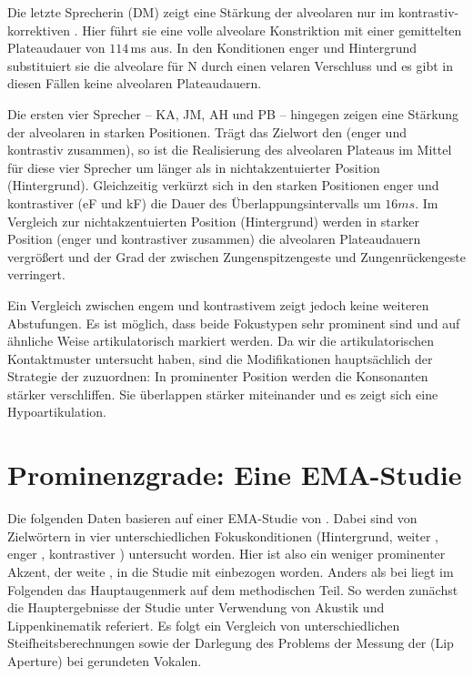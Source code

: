 Die letzte Sprecherin (DM) zeigt eine Stärkung der alveolaren  nur im kontrastiv-korrektiven . Hier führt sie eine volle alveolare Konstriktion mit einer gemittelten Plateaudauer von $114$\,ms aus. In den Konditionen enger  und Hintergrund substituiert sie die alveolare  für N durch einen velaren Verschluss und es gibt in diesen Fällen keine alveolaren Plateaudauern. 


Die ersten vier Sprecher -- KA, JM, AH und PB -- hingegen zeigen eine Stärkung der alveolaren  in  starken Positionen. Trägt das Zielwort den  (enger und kontrastiv  zusammen), so ist die Realisierung des alveolaren Plateaus im Mittel für diese vier Sprecher um  länger als in nichtakzentuierter Position (Hintergrund). Gleichzeitig verkürzt sich in den  starken Positionen enger  und kontrastiver  (eF und kF) die Dauer des Überlappungsintervalls um $16{ms}$. Im Vergleich zur nichtakzentuierten Position (Hintergrund) werden in  starker Position (enger  und kontrastiver  zusammen) die alveolaren Plateaudauern vergrößert und der Grad der  zwischen Zungenspitzengeste und Zungenrückengeste verringert. 



Ein Vergleich zwischen engem und kontrastivem  zeigt jedoch keine weiteren Abstufungen. Es ist möglich, dass beide Fokustypen sehr prominent sind und auf ähnliche Weise artikulatorisch markiert werden. Da wir die artikulatorischen Kontaktmuster untersucht haben, sind die Modifikationen hauptsächlich der Strategie der  zuzuordnen: In prominenter Position werden die Konsonanten stärker verschliffen. Sie überlappen stärker miteinander und es zeigt sich eine Hypoartikulation.

\section{Prominenzgrade: Eine EMA-Studie}
\label{sec:0603}

Die folgenden Daten basieren auf einer EMA-Studie von \citet{Mücke2014b}. Dabei sind  von Zielwörtern in vier unterschiedlichen Fokuskonditionen (Hintergrund, weiter , enger , kontrastiver ) untersucht worden. Hier ist also ein weniger prominenter Akzent, der weite , in die Studie mit einbezogen worden. Anders als bei \citet{Mücke2014b} liegt im Folgenden das Hauptaugenmerk auf dem methodischen Teil. So werden zunächst die Hauptergebnisse der Studie unter Verwendung von Akustik und Lippenkinematik referiert. Es folgt ein Vergleich von unterschiedlichen Steifheitsberechnungen sowie der Darlegung des Problems der Messung der  (Lip Aperture) bei gerundeten Vokalen.

